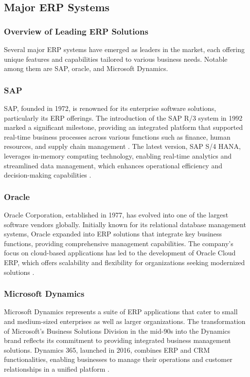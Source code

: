 \subsection{Major ERP Systems}

\subsubsection{Overview of Leading ERP Solutions}
Several major ERP systems have emerged as leaders in the market, each offering unique features and capabilities tailored to various business needs. Notable among them are SAP, oracle, and Microsoft Dynamics.

\subsubsection{SAP}
SAP, founded in 1972, is renowned for its enterprise software solutions, particularly its ERP offerings. The introduction of the SAP R/3 system in 1992 marked a significant milestone, providing an integrated platform that supported real-time business processes across various functions such as finance, human resources, and supply chain management \cite{sap_evolution,software_connect_erp}. The latest version, SAP S/4 HANA, leverages in-memory computing technology, enabling real-time analytics and streamlined data management, which enhances operational efficiency and decision-making capabilities \cite{geeksforgeeks,ptss}.

\subsubsection{Oracle}
Oracle Corporation, established in 1977, has evolved into one of the largest software vendors globally. Initially known for its relational database management systems, Oracle expanded into ERP solutions that integrate key business functions, providing comprehensive management capabilities. The company's focus on cloud-based applications has led to the development of Oracle Cloud ERP, which offers scalability and flexibility for organizations seeking modernized solutions \cite{oracle_erp,software_connect_erp}.

\subsubsection{Microsoft Dynamics}
Microsoft Dynamics represents a suite of ERP applications that cater to small and medium-sized enterprises as well as larger organizations. The transformation of Microsoft’s Business Solutions Division in the mid-90s into the Dynamics brand reflects its commitment to providing integrated business management solutions. Dynamics 365, launched in 2016, combines ERP and CRM functionalities, enabling businesses to manage their operations and customer relationships in a unified platform \cite{software_connect_erp}.

